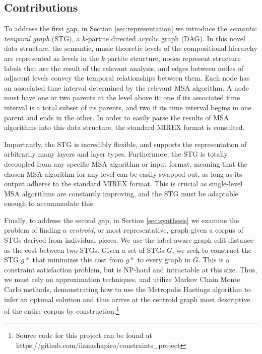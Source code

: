 \documentclass{article}
\begin{document}
\subsection{Contributions}\label{subsec:contributions}

To address the first gap, in Section \ref{sec:representation} we introduce the \textit{semantic temporal graph} (STG), a $k$-partite directed acyclic graph (DAG). In this novel data structure, the semantic, music theoretic levels of the compositional hierarchy are represented as levels in the $k$-partite structure, nodes represent structure labels that are the result of the relevant analysis, and edges between nodes of adjacent levels convey the temporal relationships between them. Each node has an associated time interval determined by the relevant MSA algorithm. A node must have one or two parents at the level above it: one if its associated time interval is a total subset of its parents, and two if its time interval begins in one parent and ends in the other. In order to easily parse the results of MSA algorithms into this data structure, the standard MIREX format is consulted.

Importantly, the STG is incredibly flexible, and supports the representation of arbitrarily many layers and layer types. Furthermore, the STG is totally decoupled from any specific MSA algorithm or input format, meaning that the chosen MSA algorithm for any level can be easily swapped out, as long as its output adheres to the standard MIREX format. This is crucial as single-level MSA algorithms are constantly improving, and the STG must be adaptable enough to accommodate this.

Finally, to address the second gap, in Section \ref{sec:synthesis} we examine the problem of finding a \textit{centroid}, or most representative, graph given a corpus of STGs derived from individual pieces. We use the label-aware graph edit distance as the cost between two STGs. Given a set of STGs $G$, we seek to construct the STG $g*$ that minimizes this cost from $g*$ to every graph in $G$. This is a constraint satisfaction problem, but is NP-hard and intractable at this size. Thus, we must rely on approximation techniques, and utilize Markov Chain Monte Carlo methods, demonstrating how to use the Metropolis Hastings algorithm to infer an optimal solution and thus arrive at the centroid graph most descriptive of the entire corpus by construction.\footnote{Source code for this project can be found at https://github.com/ilanashapiro/constraints\_project}
\end{document}
